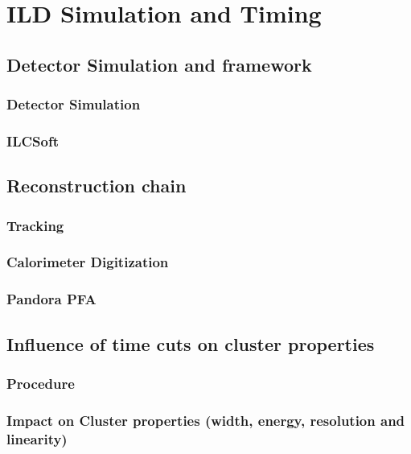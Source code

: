 \chapter{ILD Simulation and Timing}
\section{Detector Simulation and framework}
\subsection{Detector Simulation}
\subsection{ILCSoft}
\section{Reconstruction chain}
\subsection{Tracking}
\subsection{Calorimeter Digitization}
\subsection{Pandora PFA}
\section{Influence of time cuts on cluster properties}
\subsection{Procedure}
\subsection{Impact on Cluster properties (width, energy, resolution and linearity)}